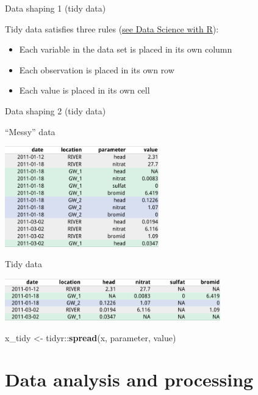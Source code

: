 \documentclass[8pt,ignorenonframetext,]{beamer}
\newenvironment{Shaded}{\begin{snugshade}}{\end{snugshade}}
\newcommand{\KeywordTok}[1]{\textcolor[rgb]{0.13,0.29,0.53}{\textbf{{#1}}}}
\newcommand{\StringTok}[1]{\textcolor[rgb]{0.31,0.60,0.02}{{#1}}}
\newcommand{\NormalTok}[1]{{#1}}
\providecommand{\tightlist}{%
  \setlength{\itemsep}{0pt}\setlength{\parskip}{0pt}}
\begin{document}
\begin{frame}{Data shaping 1 (tidy data)}

Tidy data satisfies three rules
(\href{http://garrettgman.github.io/tidying/}{see Data Science with R}):

\begin{itemize}
\tightlist
\item
  Each variable in the data set is placed in its own column
\item
  Each observation is placed in its own row
\item
  Each value is placed in its own cell
\end{itemize}

\end{frame}

\begin{frame}[fragile]{Data shaping 2 (tidy data)}

``Messy'' data

\includegraphics[width=0.50000\textwidth]{imgPres/data_tidying_table_messy.png}

Tidy data

\includegraphics[width=0.70000\textwidth]{imgPres/data_tidying_table_tidy.png}

\begin{Shaded}
\begin{Highlighting}[]
\NormalTok{x_tidy <-}\StringTok{ }\NormalTok{tidyr::}\KeywordTok{spread}\NormalTok{(x, parameter, value)}
\end{Highlighting}
\end{Shaded}

\end{frame}

\section{Data analysis and
processing}\label{data-analysis-and-processing}
\end{document}
